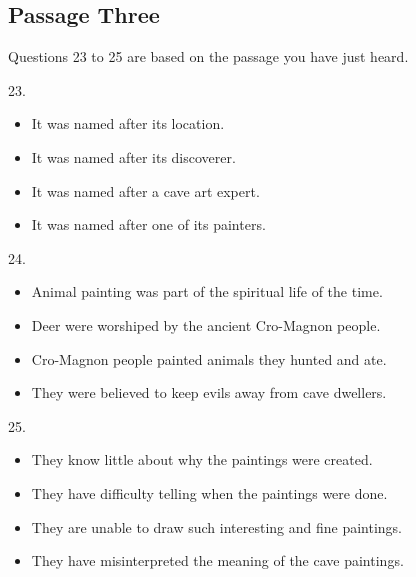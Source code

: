 \documentclass[UTF8,11pt]{ctexart}
\begin{document}
\subsection*{Passage Three}


Questions 23 to 25 are based on the passage you have just heard.


23.


\begin{itemize}[leftmargin=2em,itemsep=.2em,topsep=.4em]\item[A.] It was named after its location.
\end{itemize}

\begin{itemize}[leftmargin=2em,itemsep=.2em,topsep=.4em]\item[B.] It was named after its discoverer.
\item[C.] It was named after a cave art expert.
\item[D.] It was named after one of its painters.
\end{itemize}

24.


\begin{itemize}[leftmargin=2em,itemsep=.2em,topsep=.4em]\item[A.] Animal painting was part of the spiritual life of the time.
\end{itemize}

\begin{itemize}[leftmargin=2em,itemsep=.2em,topsep=.4em]\item[B.] Deer were worshiped by the ancient Cro-Magnon people.
\item[C.] Cro-Magnon people painted animals they hunted and ate.
\item[D.] They were believed to keep evils away from cave dwellers.
\end{itemize}

25.


\begin{itemize}[leftmargin=2em,itemsep=.2em,topsep=.4em]\item[A.] They know little about why the paintings were created.
\end{itemize}

\begin{itemize}[leftmargin=2em,itemsep=.2em,topsep=.4em]\item[B.] They have difficulty telling when the paintings were done.
\item[C.] They are unable to draw such interesting and fine paintings.
\item[D.] They have misinterpreted the meaning of the cave paintings.
\end{itemize}
\end{document}
